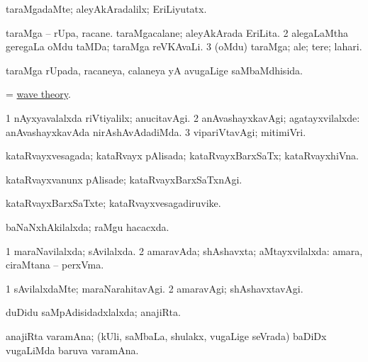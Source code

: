 \bentry
{} 
\gl{\kirxvi}
\expl{}
\bmng
 taraMgadaMte; aleyAkAradalilx; EriLiyutatx. 
\emng
\eentry

\bentry
{} 
\gl{\nA}
\expl{}
\bmng
\bnum
{} 
\banum
{} taraMga -- rUpa, racane. 
 taraMgacalane; aleyAkArada EriLita. 
\eanum
\numie
\num{2} alegaLaMtha geregaLa oMdu taMDa; taraMga reVKAvaLi. 
\num{3} (oMdu) taraMga; ale; tere; lahari. 
\enum
\emng
\eentry

\bentry
{} 
\gl{\gu}
\expl{}
\bmng
 taraMga rUpada, racaneya, calaneya yA avugaLige saMbaMdhisida. 
\emng
\eentry

\bentry
{}
\gl{\nA}
\bmng
 = \hyperref{kandict_w.pdf}{W}{wave theory}{wave theory}. 
\emng
\eentry

\bentry
{} 
\gl{\kirxvi}
\expl{}
\bmng
\bnum
\num{1} nAyxyavalalxda riVtiyalilx; anucitavAgi. 
\num{2} anAvashayxkavAgi; agatayxvilalxde:  anAvashayxkavAda nirAshAvAdadiMda. 
\num{3} vipariVtavAgi; mitimiVri. 
\enum
\emng
\eentry

\bentry
{} 
\gl{\gu}
\expl{}
\bmng
 kataRvayxvesagada; kataRvayx pAlisada; kataRvayxBarxSaTx; kataRvayxhiVna. 
\emng
\eentry

\bentry
{} 
\gl{\kirxvi}
\expl{}
\bmng
 kataRvayxvanunx pAlisade; kataRvayxBarxSaTxnAgi. 
\emng
\eentry

\bentry
{} 
\gl{\nA}
\expl{}
\bmng
 kataRvayxBarxSaTxte; kataRvayxvesagadiruvike. 
\emng
\eentry

\bentry
{} 
\gl{\gu}
\bmng
 baNaNxhAkilalxda; raMgu hacacxda. 
\emng
\eentry

\bentry
{} 
\gl{\gu}
\expl{}
\bmng
\bnum
\num{1} maraNavilalxda; sAvilalxda. 
\num{2} amaravAda; shAshavxta; aMtayxvilalxda:  amara, ciraMtana -- perxVma. 
\enum
\emng
\eentry

\bentry
{} 
\gl{\kirxvi}
\expl{}
\bmng
\bnum
\num{1} sAvilalxdaMte; maraNarahitavAgi. 
\num{2} amaravAgi; shAshavxtavAgi. 
\enum
\emng
\eentry

\bentry
{} 
\gl{\gu}
\bmng
 duDidu saMpAdisidadxlalxda; anajiRta. 
\emng
\eentry

\bentry
{}
\gl{\nA}
\expl{}
\bmng
 anajiRta varamAna; (kUli, saMbaLa, shulakx, \mo vugaLige seVrada) baDiDx \mo vugaLiMda baruva varamAna. 
\emng
\eentry

